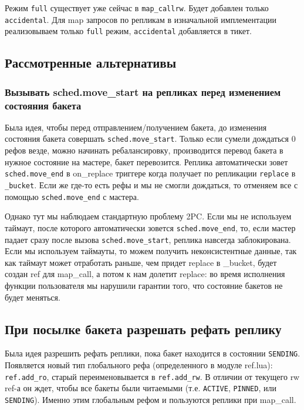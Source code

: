 Режим \texttt{full} существует уже сейчас в \texttt{map\_callrw}. Будет
добавлен только \texttt{accidental}. Для map запросов по репликам в изначальной
имплементации реализовываем только \texttt{full} режим, \texttt{accidental}
добавляется в тикет.

\subsection{Рассмотренные альтернативы}

\subsubsection*{Вызывать sched.move\_start на репликах перед изменением состояния бакета}

Была идея, чтобы перед отправлением/получением бакета, до изменения состояния
бакета совершать \texttt{sched.move\_start}. Только если сумели дождаться 0
рефов везде, можно начинать ребалансировку, производится перевод бакета в
нужное состояние на мастере, бакет перевозится. Реплика автоматически зовет
\texttt{sched.move\_end} в on\_replace триггере когда получает по репликации
\texttt{replace} в \texttt{\_bucket}. Если же где-то есть рефы и мы не смогли
дождаться, то отменяем все с помощью \texttt{sched.move\_end} с мастера.

Однако тут мы наблюдаем стандартную проблему 2PC. Если мы не используем
таймаут, после которого автоматически зовется \texttt{sched.move\_end}, то,
если мастер падает сразу после вызова \texttt{sched.move\_start}, реплика
навсегда заблокирована. Если мы используем таймауты, то можем получить
неконсистентные данные, так как таймаут может отработать раньше, чем придет
replace в \_bucket, будет создан ref для map\_call, а потом к нам долетит
replace: во время исполнения функции пользователя мы нарушили гарантии того,
что состояние бакетов не будет меняться.

\subsection*{При посылке бакета разрешать рефать реплику}

Была идея разрешить рефать реплики, пока бакет находится в состоянии
\texttt{SENDING}. Появляется новый тип глобального рефа (определенного в модуле
ref.lua): \texttt{ref.add\_ro}, старый переименовывается в
\texttt{ref.add\_rw}. В отличии от текущего rw ref-а он ждет, чтобы все бакеты
были читаемыми (т.е. \texttt{ACTIVE}, \texttt{PINNED}, или \texttt{SENDING}).
Именно этим глобальным рефом и пользуются реплики при map\_call.

